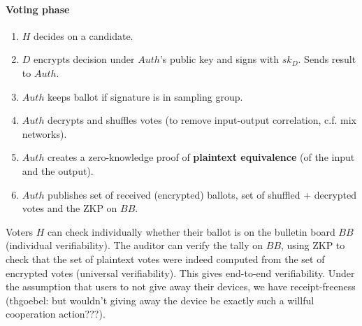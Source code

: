 \paragraph{Voting phase}
\begin{enumerate}
    \item $H$ decides on a candidate.
    \item $D$ encrypts decision under $Auth$'s public key and signs with $sk_D$. Sends result to $Auth$.
    \item $Auth$ keeps ballot if signature is in sampling group.
    \item $Auth$ decrypts and shuffles votes (to remove input-output correlation, c.f. mix networks).
    \item $Auth$ creates a zero-knowledge proof of \textbf{plaintext equivalence} (of the input and the output).
    \item $Auth$ publishes set of received (encrypted) ballots, set of shuffled + decrypted votes and the ZKP on $BB$.
\end{enumerate}
Voters $H$ can check individually whether their ballot is on the bulletin board $BB$ (individual verifiability). The auditor can verify the tally on $BB$, using ZKP to check that the set of plaintext votes were indeed computed from the set of encrypted votes (universal verifiability). This gives end-to-end verifiability.
Under the assumption that users to not give away their devices, we have receipt-freeness (thgoebel: but wouldn't giving away the device be exactly such a willful cooperation action???).

%
